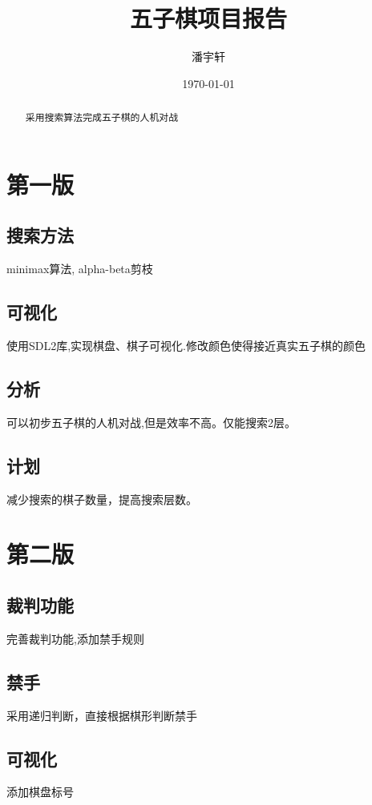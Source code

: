 \documentclass[a4paper,12pt, fontset=windows]{ctexart}
\title{五子棋项目报告}
\author{潘宇轩}
\date{\today}
\begin{document}
\maketitle

\begin{abstract}
    采用搜索算法完成五子棋的人机对战
\end{abstract}

\tableofcontents
\section{第一版}

\subsection{搜索方法}

minimax算法, alpha-beta剪枝

\subsection{可视化}
使用SDL2库,实现棋盘、棋子可视化.修改颜色使得接近真实五子棋的颜色

\subsection{分析}
可以初步五子棋的人机对战,但是效率不高。仅能搜索2层。

\subsection{计划}
减少搜索的棋子数量，提高搜索层数。

\section{第二版}

\subsection{裁判功能}
完善裁判功能,添加禁手规则

\subsection{禁手}
采用递归判断，直接根据棋形判断禁手

\subsection{可视化}
添加棋盘标号
\end{document}
